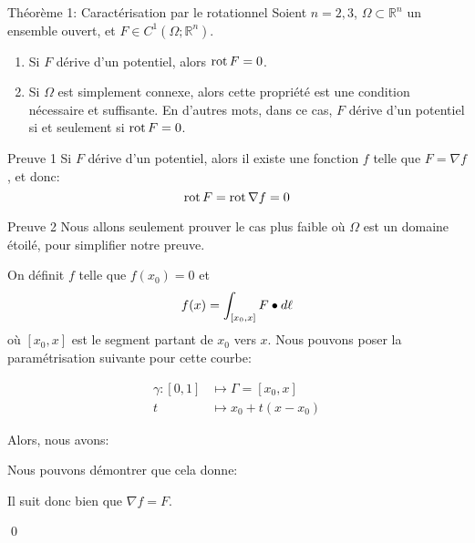 \documentclass[a4paper]{article}
\begin{document}
\begin{parag}{Théorème 1: Caractérisation par le rotationnel}
    Soient $n = 2, 3$, $\Omega \subset \mathbb{R}^n$ un ensemble ouvert, et $F \in C^1\left(\Omega; \mathbb{R}^n\right)$.

    \begin{enumerate}[left=0pt]
        \item Si $F$ dérive d'un potentiel, alors $\operatorname{rot} F = 0$.
        \item Si $\Omega$ est simplement connexe, alors cette propriété est une condition nécessaire et suffisante. En d'autres mots, dans ce cas, $F$ dérive d'un potentiel si et seulement si $\operatorname{rot} F = 0$.
    \end{enumerate}

    \begin{subparag}{Preuve 1}
        Si $F$ dérive d'un potentiel, alors il existe une fonction $f$ telle que $F = \nabla f$, et donc: 
        \[\operatorname{rot} F = \operatorname{rot} \nabla f = 0\]
    \end{subparag}

    \begin{subparag}{Preuve 2}
        Nous allons seulement prouver le cas plus faible où $\Omega$ est un domaine étoilé, pour simplifier notre preuve.

        On définit $f$ telle que $f\left(x_0\right) = 0$ et 
        \[f\left(x\right) = \int_{\left[x_0, x\right]} F \dotprod d \ell \]
        où $\left[x_0, x\right]$ est le segment partant de $x_0$ vers $x$. Nous pouvons poser la paramétrisation suivante pour cette courbe: 
        
        \[\begin{split}
        \gamma: \left[0, 1\right] &\longmapsto \Gamma = \left[x_0, x\right] \\
        t &\longmapsto x_0 + t\left(x - x_0\right)
        \end{split}\]

        Alors, nous avons: 

        Nous pouvons démontrer que cela donne:
        
        Il suit donc bien que $\nabla f = F$.

        \qed
    \end{subparag}
\end{parag}
\end{document}
